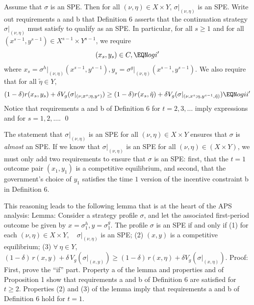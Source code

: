 \medskip\noindent
\medskip{} Assume that $\sigma$ is an SPE.
Then for all $(\nu,\eta) \in X \times Y$, $ \sigma\vert_{(\nu,\eta)}$ is
an SPE.
\medskip
{} Write out requirements a and b that Definition 6 asserts that  the continuation strategy $\sigma\vert_{(\nu,\eta)}$ must satisfy to
qualify as an SPE.  In particular,
for all $s \geq 1$ and for all $(x^{s-1},y^{s-1})
\in X^{s-1} \times Y^{s-1}$, we require
$$ (x_s, y_s) \in C , \EQN ogi' $$
where $x_s = \sigma^h\vert_{(\nu,\eta)}(x^{s-1},y^{s-1}),
y_s = \sigma^g\vert_{(\nu,\eta)}(x^{s-1},y^{s-1})$.
We also require that for all $\tilde \eta \in Y$,
$$ (1-\delta) r(x_s, y_s) + \delta V_g(\sigma\vert
       _{(\nu,  x^s;  \eta, y^s)})
       \geq (1-\delta) r(x_s, \tilde \eta) + \delta
       V_g(\sigma\vert_{(\nu,x^s; \eta,y^{s-1},\tilde \eta)}) \EQN ogii'$$
Notice that requirements a and b of Definition 6 for $t=2, 3, \ldots $
imply expressions  and  for $s = 1,2, \ldots $. \qed

\medskip
  The statement that
$\sigma\vert_{(\nu,\eta)}$ is an SPE for all $(\nu,\eta) \in
X \times Y$ ensures that $\sigma$ is {\it almost\/} an SPE.
If we know that $\sigma\vert_{(\nu,\eta)}$ is an SPE for
all $(\nu, \eta) \in   (X \times Y)$, we must only add  two
requirements to ensure that $\sigma$ is an SPE:
first, that
the $t=1$ outcome pair $(x_1, y_1)$ is a competitive equilibrium,
and second, that the government's choice of $y_1$ satisfies the
time $1$ version of the incentive constraint b in Definition 6.

This reasoning leads  to the following  lemma that is at the heart of the APS analysis:
\medskip\noindent
{\sc Lemma:}  Consider a strategy profile $\sigma$, and let
the associated first-period
outcome be given by $x=\sigma^h_1,y=\sigma^g_1$.  The profile $\sigma$ is
an SPE if and only if
\medskip
\noindent (1) for each $(\nu,\eta) \in X\times Y,\quad
\sigma\vert_{(\nu,\eta)}$ is an SPE;
\smallskip
\noindent (2) $(x,y)$ is a competitive equilibrium;
\smallskip
\noindent (3) $\forall\ \eta\in Y$,
$(1-\delta)\, r(x,y) + \delta\,V_g(\sigma\vert_{(x,y)})\geq (1-\delta)\,
r(x,\eta) + \delta V_g(\sigma\vert_{(x,\eta)})$.
\medskip\noindent
{\sc Proof:} First, prove the ``if'' part.  Property a of
the lemma and properties  and 
of Proposition 1 show that requirements a and b of
Definition 6 are satisfied for $t \geq 2$.  Properties (2) and
(3) of the lemma imply that requirements a and b of Definition 6
hold for $t=1$.

